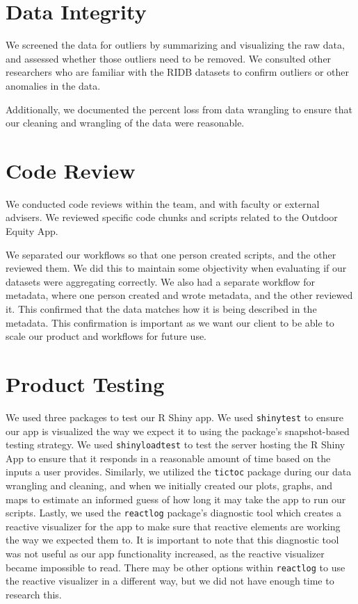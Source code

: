 \documentclass[
]{book}
\begin{document}
\hypertarget{data-integrity}{%
\section{Data Integrity}\label{data-integrity}}

We screened the data for outliers by summarizing and visualizing the raw data, and assessed whether those outliers need to be removed. We consulted other researchers who are familiar with the RIDB datasets to confirm outliers or other anomalies in the data.

Additionally, we documented the percent loss from data wrangling to ensure that our cleaning and wrangling of the data were reasonable.

\hypertarget{code-review}{%
\section{Code Review}\label{code-review}}

We conducted code reviews within the team, and with faculty or external advisers. We reviewed specific code chunks and scripts related to the Outdoor Equity App.

We separated our workflows so that one person created scripts, and the other reviewed them. We did this to maintain some objectivity when evaluating if our datasets were aggregating correctly. We also had a separate workflow for metadata, where one person created and wrote metadata, and the other reviewed it. This confirmed that the data matches how it is being described in the metadata. This confirmation is important as we want our client to be able to scale our product and workflows for future use.

\hypertarget{product-testing}{%
\section{Product Testing}\label{product-testing}}

We used three packages to test our R Shiny app. We used \texttt{shinytest} \citep{R-shinytest} to ensure our app is visualized the way we expect it to using the package's snapshot-based testing strategy. We used \texttt{shinyloadtest} \citep{R-shinyloadtest} to test the server hosting the R Shiny App to ensure that it responds in a reasonable amount of time based on the inputs a user provides. Similarly, we utilized the \texttt{tictoc} \citep{R-tictoc} package during our data wrangling and cleaning, and when we initially created our plots, graphs, and maps to estimate an informed guess of how long it may take the app to run our scripts. Lastly, we used the \texttt{reactlog} \citep{R-reactlog} package's diagnostic tool which creates a reactive visualizer for the app to make sure that reactive elements are working the way we expected them to. It is important to note that this diagnostic tool was not useful as our app functionality increased, as the reactive visualizer became impossible to read. There may be other options within \texttt{reactlog} to use the reactive visualizer in a different way, but we did not have enough time to research this.
\end{document}
